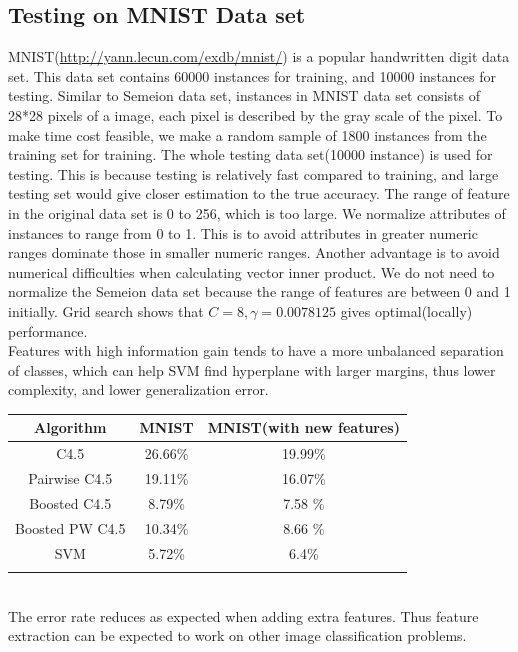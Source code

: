 \documentclass[a4paper,11pt]{nurop}
\begin{document}
\subsection{Testing on MNIST Data set}
MNIST(\url{http://yann.lecun.com/exdb/mnist/}) is a popular handwritten digit data set. This data set contains 60000 instances for training, and 10000 instances for testing.  Similar to Semeion data set, instances in MNIST data set consists of 28*28 pixels of a image, each pixel is described by the gray scale of the pixel. To make time cost feasible, we make a random sample of 1800 instances from the training set for training. The whole testing data set(10000 instance) is used for testing. This is because testing is relatively fast compared to training, and large testing set would give closer estimation to the true accuracy. The range of feature in the original data set is 0 to 256, which is too large. We normalize attributes of instances to range from 0 to 1. This is to avoid attributes in greater numeric ranges dominate those in smaller numeric ranges. Another advantage is to avoid numerical difficulties when calculating vector inner product\cite{svm}. We do not need to normalize the Semeion data set because the range of features are between 0 and 1 initially. Grid search shows that $C=8, \gamma=0.0078125$ gives optimal(locally) performance.\\
Features with high information gain tends to have a more unbalanced separation of classes, which can help SVM find hyperplane with larger margins, thus lower complexity, and lower generalization error.\\
\vspace{0.5cm}
\begin{tabular}{c c c}
Algorithm	              & MNIST	& MNIST(with new features)\\
\hline \hline
C4.5                     & 26.66\%  & 19.99\%\\
Pairwise C4.5            &19.11\%   & 16.07\%\\
Boosted C4.5             & 8.79\%	& 7.58 \%\\
Boosted PW C4.5	         & 10.34\%  & 8.66 \%\\
SVM                      & 5.72\%   & 6.4\%\\
  \\
\end{tabular}
\vspace{0.5cm}\\
The error rate reduces as expected when adding extra features. Thus feature extraction can be expected to work on other image classification problems.\\
\end{document}
